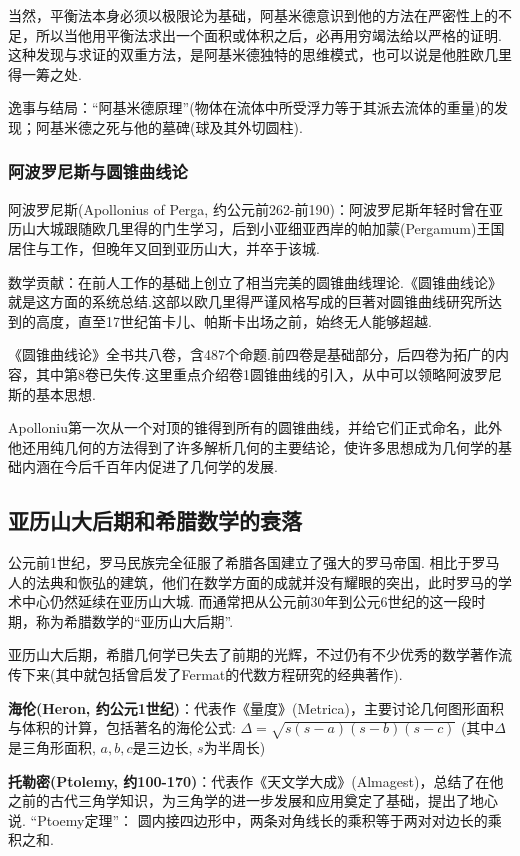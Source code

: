 \documentclass{Math_Note}
\begin{document}
当然，平衡法本身必须以极限论为基础，阿基米德意识到他的方法在严密性上的不足，所以当他用平衡法求出一个面积或体积之后，必再用穷竭法给以严格的证明.
这种发现与求证的双重方法，是阿基米德独特的思维模式，也可以说是他胜欧几里得一筹之处.

逸事与结局：“阿基米德原理”(物体在流体中所受浮力等于其派去流体的重量)的发现；阿基米德之死与他的墓碑(球及其外切圆柱).

\subsubsection{阿波罗尼斯与圆锥曲线论}
阿波罗尼斯(Apollonius of Perga, 约公元前262-前190)：阿波罗尼斯年轻时曾在亚历山大城跟随欧几里得的门生学习，后到小亚细亚西岸的帕加蒙(Pergamum)王国居住与工作，但晚年又回到亚历山大，并卒于该城.

数学贡献：在前人工作的基础上创立了相当完美的圆锥曲线理论.《圆锥曲线论》就是这方面的系统总结.这部以欧几里得严谨风格写成的巨著对圆锥曲线研究所达到的高度，直至17世纪笛卡儿、帕斯卡出场之前，始终无人能够超越.

《圆锥曲线论》全书共八卷，含487个命题.前四卷是基础部分，后四卷为拓广的内容，其中第8卷已失传.这里重点介绍卷1圆锥曲线的引入，从中可以领略阿波罗尼斯的基本思想.

Apolloniu第一次从一个对顶的锥得到所有的圆锥曲线，并给它们正式命名，此外他还用纯几何的方法得到了许多解析几何的主要结论，使许多思想成为几何学的基础内涵在今后千百年内促进了几何学的发展.

\subsection{亚历山大后期和希腊数学的衰落}
公元前1世纪，罗马民族完全征服了希腊各国建立了强大的罗马帝国. 相比于罗马人的法典和恢弘的建筑，他们在数学方面的成就并没有耀眼的突出，此时罗马的学术中心仍然延续在亚历山大城. 
而通常把从公元前30年到公元6世纪的这一段时期，称为希腊数学的“亚历山大后期”.

亚历山大后期，希腊几何学已失去了前期的光辉，不过仍有不少优秀的数学著作流传下来(其中就包括曾启发了Fermat的代数方程研究的经典著作).

\textbf{海伦(Heron, 约公元1世纪)}：代表作《量度》(Metrica)，主要讨论几何图形面积与体积的计算，包括著名的海伦公式: $\Delta = \sqrt{s(s-a)(s-b)(s-c)}$ 
(其中$\Delta$是三角形面积, $a, b, c$是三边长, $s$为半周长)

\textbf{托勒密(Ptolemy, 约100-170)}：代表作《天文学大成》(Almagest)，总结了在他之前的古代三角学知识，为三角学的进一步发展和应用奠定了基础，提出了地心说. “Ptoemy定理”：
圆内接四边形中，两条对角线长的乘积等于两对对边长的乘积之和.
\end{document}
